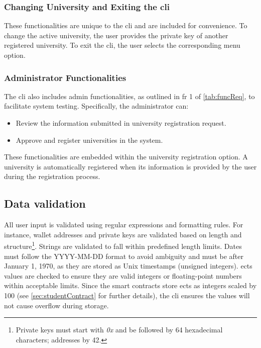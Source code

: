 \subsubsection{Changing University and Exiting the \gls{cli}}
These functionalities are unique to the \gls{cli} and are included for convenience. To change the active university, the user provides the private key of another registered university. To exit the \gls{cli}, the user selects the corresponding menu option.

\subsubsection{Administrator Functionalities}
The \gls{cli} also includes admin functionalities, as outlined  in \gls{fr} 1 of \cref{tab:funcReq}, to facilitate system testing. Specifically, the administrator can:
\begin{itemize}
    \item Review the information submitted in university registration request.
    \item Approve and register universities in the system.
\end{itemize}
These functionalities are embedded within the university registration option. A university is automatically registered when its information is provided by the user during the registration process.

\subsection{Data validation}
All user input is validated using regular expressions and formatting rules. For instance, wallet addresses and private keys are validated based on length and structure\footnote{Private keys must start with \textit{0x} and be followed by 64 hexadecimal characters; addresses by 42.}. Strings are validated to fall within predefined length limits. Dates must follow the YYYY-MM-DD format to avoid ambiguity and must be after January 1, 1970, as they are stored as Unix timestamps (unsigned integers). \gls{ects} values are checked to ensure they are valid integers or floating-point numbers within acceptable limits. Since the smart contracts store \gls{ects} as integers scaled by 100 (see \cref{sec:studentContract} for further details), the \gls{cli} ensures the values will not cause overflow during storage.